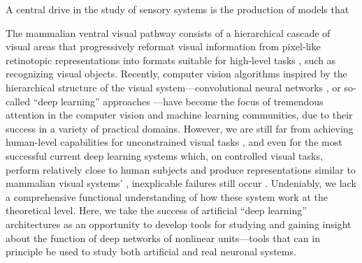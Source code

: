A central drive in the study of sensory systems is the production of models that 

The mammalian ventral visual pathway consists of a hierarchical cascade of visual areas that progressively reformat visual information from pixel-like retinotopic representations into formats suitable for high-level tasks \cite{dicarlo2007untangling, dicarlo2012does}, such as recognizing visual objects. Recently, computer vision algorithms inspired by the hierarchical structure of the visual system---convolutional neural networks \cite{fukushima1980neocognitron, lecun1998gradient, riesenhuber1999hierarchical}, or so-called ``deep learning'' approaches \cite{krizhevsky2012imagenet}---have become the focus of tremendous attention in the computer vision and machine learning communities, due to their success in a variety of practical domains. However, we are still far from achieving human-level capabilities for unconstrained visual tasks \cite{ghodrati2014feedforward}, and even for the most successful current deep learning systems which, on controlled visual tasks, perform relatively close to human subjects \cite{serre2007feedforward, cirecsan2012multi, russakovsky2014imagenet, taigman2013deepface, sun2014deep, viglarge} and produce representations similar to mammalian visual systems' \cite{yamins2014performance, cadieu2014deep}, inexplicable failures still occur \cite{szegedy2013intriguing}. 
Undeniably, we lack a comprehensive functional understanding of how these system work at the theoretical level. Here, we take the success of artificial ``deep learning'' architectures as an opportunity to develop tools for studying and gaining insight about the function of deep networks of nonlinear units---tools that can in principle be used to study both artificial and real neuronal systems. 

